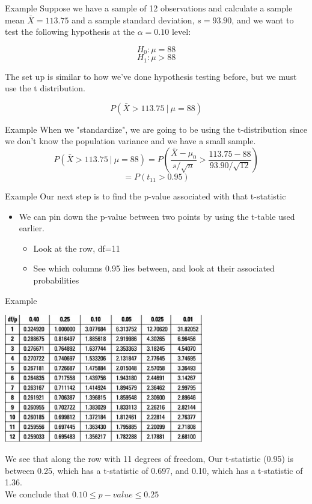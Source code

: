 \documentclass{beamer}
\begin{document}
\begin{frame}{Example}
	Suppose we have a sample of 12 observations and calculate a sample mean $\bar{X}=113.75$ and a sample standard deviation, $s=93.90$, and we want to test the following hypothesis at the $\alpha=0.10$ level:

	\[ 
		H_0: \mu=88 
	\]
	\[ 
		H_1: \mu > 88 
	\]
	
	The set up is similar to how we've done hypothesis testing before, but we must use the t distribution.
	
	\[ 
		P(\bar{X} > 113.75 \ \vert \ \mu = 88) 
	\]
\end{frame}

\begin{frame}{Example}
	When we "standardize", we are going to be using the t-distribution since we don't know the population variance and we have a small sample. 
	\[ 
		P(\bar{X} > 113.75 \ \vert \ \mu=88) = P(\frac{\bar{X}-\mu_0}{s/\sqrt{n}} > \frac{113.75-88}{93.90/\sqrt{12}})
	\]
	\[ 
		= P(t_{11}>0.95)
	\]
\end{frame}


\begin{frame}{Example}
	Our next step is to find the p-value associated with that t-statistic
	\begin{itemize}
		\item We can pin down the p-value between two points by using the t-table used earlier. 
		      \begin{itemize}
		      	\item Look at the row, df=11
		      	\item See which columns 0.95 lies between, and look at their associated probabilities 
		      \end{itemize}
	\end{itemize}
\end{frame}

\begin{frame}{Example}
	\begin{center}
		\includegraphics[width=0.65\textwidth]{t_table4}\\
	\end{center}
	We see that along the row with 11 degrees of freedom,  Our t-statistic (0.95) is between 0.25, which has a t-statistic of 0.697, and 0.10, which has a t-statistic of 1.36.\\
	
	We conclude that $0.10 \leq p-value \leq 0.25$
\end{frame}
\end{document}
